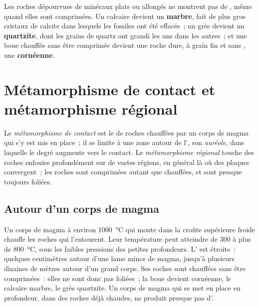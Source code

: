 Les roches dépourvues de minéraux plats ou allongés ne montrent pas de
, même quand elles sont comprimées. Un calcaire devient un
\textbf{marbre}, fait de plus gros cristaux de calcite dans lesquels les
fossiles ont été effacés~; un grès devient un \textbf{quartzite}, dont les
grains de quartz ont grandi les uns dans les autres~; et une boue chauffée
sans être comprimée devient une roche dure, à grain fin et sans ,
une \textbf{cornéenne}.

\section{Métamorphisme de contact et métamorphisme régional}

\begin{definition}\label{def:g12:metamorphic-rocks:contact-regional}
Le \emph{métamorphisme de contact}
est le  de roches chauffées par un corps de magma qui s'y est
mis en place~; il se limite à une zone autour de l', son
\emph{auréole}, dans laquelle le degré augmente vers
le contact. Le \emph{métamorphisme régional}
touche des roches enfouies profondément sur de vastes régions, en général
là où des plaques convergent~; les roches sont comprimées autant que
chauffées, et sont presque toujours foliées.
\end{definition}

\subsection{Autour d'un corps de magma}

Un corps de magma à environ \qty{1000}{\celsius} qui monte dans la croûte
supérieure froide chauffe les roches qui l'entourent. Leur température peut
atteindre de 300 à plus de \qty{800}{\celsius}, sous les faibles pressions
des petites profondeurs. L' est étroite~: quelques centimètres
autour d'une lame mince de magma, jusqu'à plusieurs dizaines de mètres
autour d'un grand corps. Ses roches sont chauffées sans être comprimées~:
elles ne sont donc pas foliées~; la boue devient cornéenne, le calcaire
marbre, le grès quartzite. Un corps de magma qui se met en place en
profondeur, dans des roches déjà chaudes, ne produit presque pas
d'.

